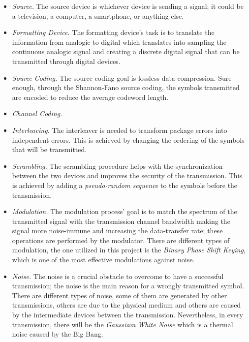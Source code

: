 \begin{itemize}
    \renewcommand{\labelitemi}{$\diamond$}
    \item \textsl{Source.} The source device is whichever device is sending a signal; it could be a television, a computer, a smartphone, or anything else.
    \item \textsl{Formatting Device.} The formatting device's task is to translate the information from analogic to digital which translates into sampling the continuous analogic signal and creating a discrete digital signal that can be transmitted through digital devices.
    \item \textsl{Source Coding.} The source coding goal is lossless data compression. Sure enough, through the Shannon-Fano source coding, the symbols transmitted are encoded to reduce the average codeword length.
    \item \textsl{Channel Coding.} 
    \item \textsl{Interleaving.} The interleaver is needed to transform package errors into independent errors. This is achieved by changing the ordering of the symbols that will be transmitted.
    \item \textsl{Scrambling.} The scrambling procedure helps with the synchronization between the two devices and improves the security of the transmission. This is achieved by adding a \textit{pseudo-random sequence} to the symbols before the transmission.
    \item \textsl{Modulation.} The modulation process' goal is to match the spectrum of the transmitted signal with the transmission channel bandwidth making the signal more noise-immune and increasing the data-transfer rate; these operations are performed by the modulator. There are different types of modulation, the one utilized in this project is the \textsl{Binary Phase Shift Keying}, which is one of the most effective modulations against noise. 
    
    \item \textsl{Noise.} The noise is a crucial obstacle to overcome to have a successful transmission; the noise is the main reason for a wrongly transmitted symbol. There are different types of noise, some of them are generated by other transmissions, others are due to the physical medium and others are caused by the intermediate devices between the transmission. Nevertheless, in every transmission, there will be the \textsl{Gaussiam White Noise} which is a thermal noise caused by the Big Bang.

\end{itemize}
